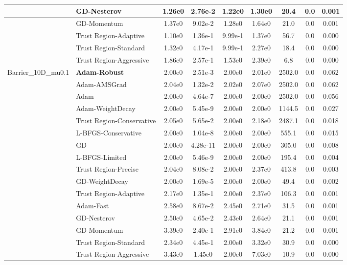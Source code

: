 \documentclass[10pt]{article}
\begin{document}
\begin{longtable}{|l|l|c|c|c|c|c|c|c|}
\hline
 & GD-Nesterov & 1.26e0 & 2.76e-2 & 1.22e0 & 1.30e0 & 20.4 & 0.0 & 0.001 \\
\hline
 & GD-Momentum & 1.37e0 & 9.02e-2 & 1.28e0 & 1.64e0 & 21.0 & 0.0 & 0.001 \\
\hline
 & Trust Region-Adaptive & 1.10e0 & 1.36e-1 & 9.99e-1 & 1.37e0 & 56.7 & 0.0 & 0.000 \\
\hline
 & Trust Region-Standard & 1.32e0 & 4.17e-1 & 9.99e-1 & 2.27e0 & 18.4 & 0.0 & 0.000 \\
\hline
 & Trust Region-Aggressive & 1.86e0 & 2.57e-1 & 1.53e0 & 2.39e0 & 6.8 & 0.0 & 0.000 \\
Barrier\_10D\_mu0.1 & \textbf{Adam-Robust} & 2.00e0 & 2.51e-3 & 2.00e0 & 2.01e0 & 2502.0 & 0.0 & 0.062 \\
\hline
 & Adam-AMSGrad & 2.04e0 & 1.32e-2 & 2.02e0 & 2.07e0 & 2502.0 & 0.0 & 0.062 \\
\hline
 & Adam & 2.00e0 & 4.64e-7 & 2.00e0 & 2.00e0 & 2502.0 & 0.0 & 0.056 \\
\hline
 & Adam-WeightDecay & 2.00e0 & 5.45e-9 & 2.00e0 & 2.00e0 & 1144.5 & 0.0 & 0.027 \\
\hline
 & Trust Region-Conservative & 2.05e0 & 5.65e-2 & 2.00e0 & 2.18e0 & 2487.1 & 0.0 & 0.018 \\
\hline
 & L-BFGS-Conservative & 2.00e0 & 1.04e-8 & 2.00e0 & 2.00e0 & 555.1 & 0.0 & 0.015 \\
\hline
 & GD & 2.00e0 & 4.28e-11 & 2.00e0 & 2.00e0 & 305.0 & 0.0 & 0.008 \\
\hline
 & L-BFGS-Limited & 2.00e0 & 5.46e-9 & 2.00e0 & 2.00e0 & 195.4 & 0.0 & 0.004 \\
\hline
 & Trust Region-Precise & 2.04e0 & 8.08e-2 & 2.00e0 & 2.37e0 & 413.8 & 0.0 & 0.003 \\
\hline
 & GD-WeightDecay & 2.00e0 & 1.69e-5 & 2.00e0 & 2.00e0 & 49.4 & 0.0 & 0.002 \\
\hline
 & Trust Region-Adaptive & 2.17e0 & 1.35e-1 & 2.00e0 & 2.37e0 & 106.3 & 0.0 & 0.001 \\
\hline
 & Adam-Fast & 2.58e0 & 8.67e-2 & 2.45e0 & 2.71e0 & 31.5 & 0.0 & 0.001 \\
\hline
 & GD-Nesterov & 2.50e0 & 4.65e-2 & 2.43e0 & 2.64e0 & 21.1 & 0.0 & 0.001 \\
\hline
 & GD-Momentum & 3.39e0 & 2.40e-1 & 2.91e0 & 3.84e0 & 21.2 & 0.0 & 0.001 \\
\hline
 & Trust Region-Standard & 2.34e0 & 4.45e-1 & 2.00e0 & 3.32e0 & 30.9 & 0.0 & 0.000 \\
\hline
 & Trust Region-Aggressive & 3.43e0 & 1.45e0 & 2.00e0 & 7.03e0 & 10.9 & 0.0 & 0.000 \\

\end{longtable}
\end{document}
